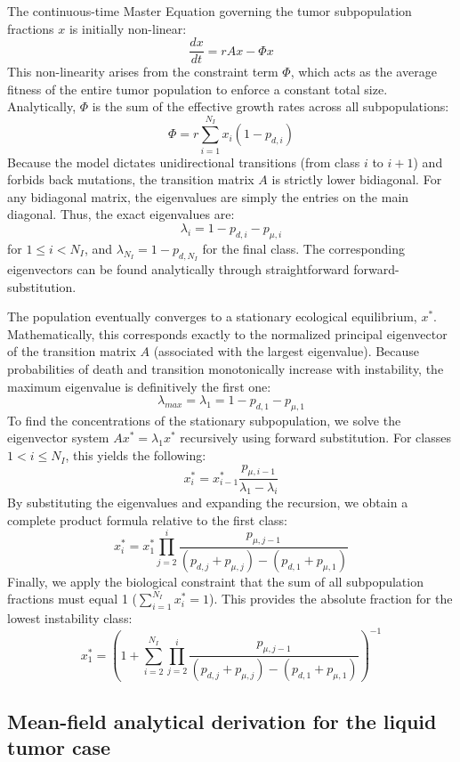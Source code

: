 \documentclass[10pt, aps, rmp,  twocolumn, superscriptaddress, floatfix, showkeys]{revtex4-2}
\begin{document}
The continuous-time Master Equation governing the tumor subpopulation fractions $x$ is initially non-linear:
$$\frac{dx}{dt} = rAx - \Phi x$$
This non-linearity arises from the constraint term $\Phi$, which acts as the average fitness of the entire tumor population to enforce a constant total size. Analytically, $\Phi$ is the sum of the effective growth rates across all subpopulations:
$$\Phi = r \sum_{i=1}^{N_I} x_i (1 - p_{d,i})$$
Because the model dictates unidirectional transitions (from class $i$ to $i+1$) and forbids back mutations, the transition matrix $A$ is strictly lower bidiagonal. For any bidiagonal matrix, the eigenvalues are simply the entries on the main diagonal. Thus, the exact eigenvalues are:
$$\lambda_i = 1 - p_{d,i} - p_{\mu,i}$$
for $1 \leq i < N_I$, and $\lambda_{N_I} = 1 - p_{d,N_I}$ for the final class. The corresponding eigenvectors can be found analytically through straightforward forward-substitution.

The population eventually converges to a stationary ecological equilibrium, $x^*$. Mathematically, this corresponds exactly to the normalized principal eigenvector of the transition matrix $A$ (associated with the largest eigenvalue). Because probabilities of death and transition monotonically increase with instability, the maximum eigenvalue is definitively the first one:
$$\lambda_{max} = \lambda_1 = 1 - p_{d,1} - p_{\mu,1}$$
To find the concentrations of the stationary subpopulation, we solve the eigenvector system $A x^* = \lambda_1 x^*$ recursively using forward substitution. For classes $1 < i \leq N_I$, this yields the following:
$$x_i^* = x_{i-1}^* \frac{p_{\mu, i-1}}{\lambda_1 - \lambda_i}$$
By substituting the eigenvalues and expanding the recursion, we obtain a complete product formula relative to the first class:
$$x_i^* = x_1^* \prod_{j=2}^i \frac{p_{\mu, j-1}}{(p_{d,j} + p_{\mu,j}) - (p_{d,1} + p_{\mu,1})}$$
Finally, we apply the biological constraint that the sum of all subpopulation fractions must equal 1 ($\sum_{i=1}^{N_I} x_i^* = 1$). This provides the absolute fraction for the lowest instability class:
$$x_1^* = \left( 1 + \sum_{i=2}^{N_I} \prod_{j=2}^i \frac{p_{\mu, j-1}}{(p_{d,j} + p_{\mu,j}) - (p_{d,1} + p_{\mu,1})} \right)^{-1}$$

\subsection*{Mean-field analytical derivation for the liquid tumor case}
\end{document}
